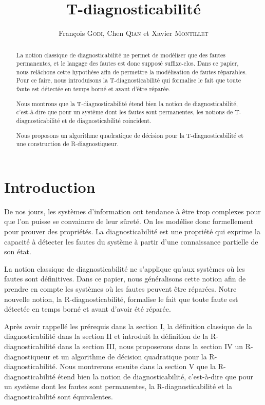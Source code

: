 \documentclass[10pt,a4paper]{article}
\author{Fran\c{c}ois \textsc{Godi}, Chen \textsc{Qian} et Xavier \textsc{Montillet}}
\title{T-diagnosticabilit\'e}
\begin{document}
\maketitle

\begin{abstract}
La notion classique de diagnosticabilit\'e ne permet de mod\'eliser que des fautes permanentes, et le langage des fautes est donc suppos\'e suffixe-clos. Dans ce papier, nous rel\^achons cette hypoth\`ese afin de permettre la mod\'elisation de fautes r\'eparables. Pour ce faire, nous introduisons la T-diagnosticabilit\'e qui formalise le fait que toute faute est d\'etect\'ee en temps born\'e et avant d'\^etre r\'epar\'ee.

Nous montrons que la T-diagnosticabilit\'e \'etend bien la notion de diagnosticabilit\'e, c'est-\`a-dire que pour un syst\`eme dont les fautes sont permanentes, les notions de T-diagnosticabilit\'e et de diagnosticabilit\'e coincident.

Nous proposons un algorithme quadratique de d\'ecision pour la T-diagnosticabilit\'e et une construction de R-diagnostiqueur.
\end{abstract}

\section*{Introduction}

De nos jours, les syst\`emes d'information ont tendance \`a \^etre trop complexes pour que l'on puisse se convaincre de leur sûret\'e. On les mod\'elise donc formellement pour prouver des propriétés. La diagnosticabilit\'e est une propri\'et\'e qui exprime la capacit\'e \`a d\'etecter les fautes du syst\`eme \`a partir d'une connaissance partielle de son \'etat.

La notion classique de diagnosticabilit\'e\cite{SamSRST96} ne s'applique qu'aux systèmes où les fautes sont définitives. Dans ce papier, nous généralisons cette notion afin de prendre en compte les systèmes où les fautes peuvent être r\'eparées. Notre nouvelle notion, la R-diagnosticabilit\'e, formalise le fait que toute faute est détectée en temps born\'e et avant d'avoir été r\'epar\'ee.

Après avoir rappellé les prérequis dans la section I, la définition classique de la diagnosticabilité dans la section II et introduit la définition de la R-diagnosticabilit\'e dans la section III, nous proposerons dans la section IV un R-diagnostiqueur et un algorithme de d\'ecision quadratique pour la R-diagnosticabilit\'e. Nous montrerons ensuite dans la section V que la R-diagnosticabilit\'e \'etend bien la notion de diagnosticabilit\'e, c'est-\`a-dire que pour un syst\`eme dont les fautes sont permanentes, la R-diagnosticabilit\'e et la diagnosticabilit\'e sont \'equivalentes.
\end{document}
